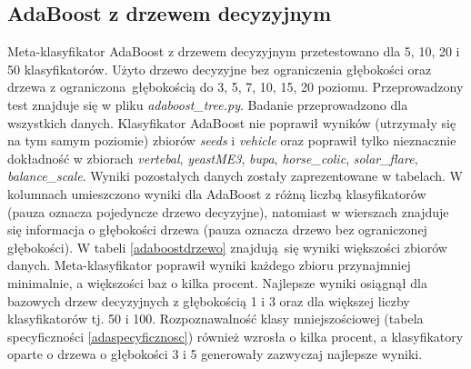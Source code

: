 \subsection{AdaBoost z drzewem decyzyjnym}
Meta-klasyfikator AdaBoost z drzewem decyzyjnym przetestowano dla 5, 10, 20 i 50 klasyfikatorów. Użyto drzewo decyzyjne bez ograniczenia głębokości oraz drzewa z ograniczona głębokością do 3, 5, 7, 10, 15, 20 poziomu. Przeprowadzony test znajduje się w pliku \textit{adaboost\_tree.py}. Badanie przeprowadzono dla wszystkich danych. Klasyfikator AdaBoost nie poprawił wyników (utrzymały się na tym samym poziomie) zbiorów \textit{seeds} i \textit{vehicle} oraz poprawił tylko nieznacznie dokładność w zbiorach \textit{vertebal}, \textit{yeastME3}, \textit{bupa}, \textit{horse\_colic}, \textit{solar\_flare}, \textit{balance\_scale}. Wyniki pozostałych danych zostały zaprezentowane w tabelach. W kolumnach umieszczono wyniki dla AdaBoost z różną liczbą klasyfikatorów (pauza oznacza pojedyncze drzewo decyzyjne), natomiast w wierszach znajduje się informacja o głębokości drzewa (pauza oznacza drzewo bez ograniczonej głębokości). W tabeli \ref{adaboostdrzewo} znajdują się wyniki większości zbiorów danych. Meta-klasyfikator poprawił wyniki każdego zbioru przynajmniej minimalnie, a większości baz o kilka procent. Najlepsze wyniki osiągnął dla bazowych drzew decyzyjnych z głębokością 1 i 3 oraz dla większej liczby klasyfikatorów tj. 50 i 100. Rozpoznawalność klasy mniejszościowej (tabela specyficzności \ref{adaspecyficznosc}) również wzrosła o kilka procent, a klasyfikatory oparte o drzewa o głębokości 3 i 5 generowały zazwyczaj najlepsze wyniki.
